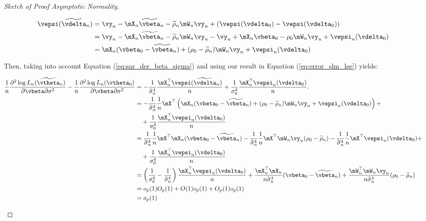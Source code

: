 \documentclass[english,12pt]{book}\usepackage[]{graphicx}\usepackage[]{xcolor}
\begin{document}
\begin{proof}[Sketch of Proof Asymptotic Normality]
\begin{enumerate}
   \begin{equation}\label{eq:error_slm_lee}
    \begin{aligned}
    \vepsi(\widetilde{\vdelta}_n) & = \vy_n - \mX_n\widetilde{\vbeta}_n - \widetilde{\rho}_n\mW_n\vy_n +(\vepsi(\vdelta_0) -  \vepsi(\vdelta_0)) \\
    & = \vy_n - \mX_n\widetilde{\vbeta}_n - \widetilde{\rho}_n\mW_n\vy_n - \vy_n + \mX_n\vbeta_0 - \rho_0\mW_n\vy_n + \vepsi_n(\vdelta_0) \\
    & = \mX_n(\vbeta_0 - \widetilde{\vbeta}_n) + (\rho_0 - \widetilde{\rho}_n)\mW_n\vy_n + \vepsi_n(\vdelta_0) 
    \end{aligned}
   \end{equation}
   
   Then, taking into account Equation (\ref{eq:sar_der_beta_sigma}) and using our result in Equation (\ref{eq:error_slm_lee}) yields:
   
      \begin{equation*}
    \begin{aligned}
    \frac{1}{n}\frac{\partial^2 \log L_n(\widetilde{\vtheta}_n)}{\partial \vbeta \partial \sigma^2} - \frac{1}{n}\frac{\partial^2 \log L_n(\vtheta_0)}{\partial \vbeta \partial \sigma^2} & = - \frac{1}{\widetilde{\sigma}^4_n} \frac{\mX_n^\top \vepsi(\widetilde{\vdelta}_n)}{n}+  \frac{1}{\sigma^4_0} \frac{\mX^\top_n \vepsi_n(\vdelta_0)}{n}. \\
    & = - \frac{1}{\widetilde{\sigma}^4_n}\frac{1}{n}\mX^\top\left(\mX_n(\vbeta_0 - \widetilde{\vbeta}_n) + (\rho_0 - \widetilde{\rho}_n)\mW_n\vy_n + \vepsi_n(\vdelta_0) \right)+  \\
    & \quad + \frac{1}{\sigma^4_0} \frac{\mX^\top_n \vepsi_n(\vdelta_0)}{n} \\
  & = \frac{1}{\widetilde{\sigma}^4_n}\frac{1}{n}\mX^\top\mX_n(\vbeta_0 - \widetilde{\vbeta}_n) - \frac{1}{\widetilde{\sigma}^4_n}\frac{1}{n}\mX^\top\mW_n\vy_n(\rho_0 - \widetilde{\rho}_n) - \frac{1}{\widetilde{\sigma}^4_n}\frac{1}{n}\mX^\top \vepsi_n(\vdelta_0) + \\
   & \quad + \frac{1}{\sigma^4_0} \frac{\mX^\top_n \vepsi_n(\vdelta_0)}{n} \\
  & = \left(\frac{1}{\sigma^4_0} - \frac{1}{\widetilde{\sigma}^4_n}\right)\frac{\mX^\top_n \vepsi_n(\vdelta_0)}{n} + \frac{\mX^\top_n\mX_n}{n\widetilde{\sigma}^4_n}(\vbeta_0 - \widetilde{\vbeta}_n) + \frac{\mW_n^\top\mW_n\vy_n}{n\widetilde{\sigma}^4_n}(\rho_0 - \widetilde{\rho}_n) \\
  & = o_p(1)O_p(1) + O(1)o_p(1) + O_p(1)o_p(1) \\
  & = o_p(1)
    \end{aligned}
   \end{equation*}
   

\end{enumerate}
\end{proof}
\end{document}
